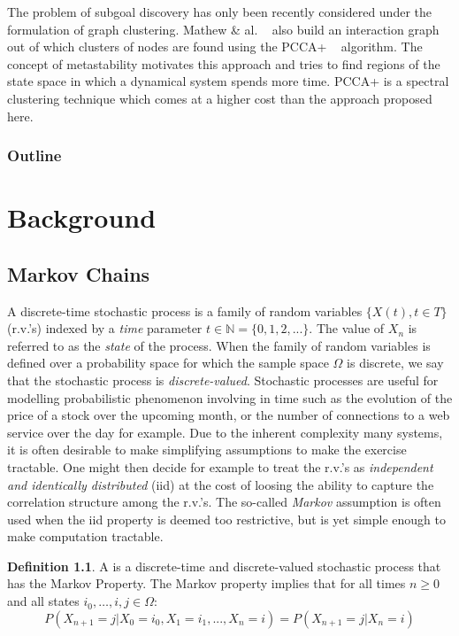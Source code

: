 \documentclass[12pt, oneside, extrafontsizes]{memoir}  %
\newcommand{\rvs}{r.v.'s\xspace}
\newcommand{\termidx}[1]{\index{#1}{\textbf{#1}}}
\theoremstyle{plain}
\theoremstyle{definition}
\newtheorem{defn}{Definition}[section]
\begin{document}
The problem of subgoal discovery has only been recently considered under the
formulation of graph clustering. Mathew \& al. ~\cite{Mathew2012} also build an
interaction graph out of which clusters of nodes are found using the PCCA+
~\cite{Weber2004} algorithm. The concept of metastability motivates this approach
and tries to find regions of the state space in which a dynamical system spends more
time. PCCA+ is a spectral clustering technique which comes at a higher cost than the
approach proposed here.

\subsection{Outline}
\chapter{Background}

\section{Markov Chains}

A discrete-time stochastic process is a family of random variables $\{ X(t), t \in T\}$
(\rvs) indexed by a \textit{time} parameter $t \in \mathbb{N} = \{0, 1, 2,...\}$. The
value of $X_n$ is referred to as the \textit{state} of the process. When the family of
random variables is defined over a probability space for which the sample space
$\Omega$ is discrete, we say that the stochastic process is \textit{discrete-valued}.
Stochastic processes are useful for modelling probabilistic phenomenon involving in
time such as the evolution of the price of a stock over the upcoming month, or the
number of connections to a web service over the day for example. Due to the inherent
complexity many systems, it is often desirable to make simplifying assumptions to
make the exercise tractable. One might then decide for example to treat the \rvs as
\textit{independent and identically distributed} (iid) at the cost of loosing the ability to
capture the correlation structure among the \rvs. The so-called \textit{Markov}
assumption is often used when the iid property is deemed too restrictive, but is yet
simple enough to make computation tractable.

\begin{defn}
A \termidx{Markov Chain} is a discrete-time and discrete-valued stochastic process
that has the Markov Property. The Markov property implies that for all times $n \geq
0$ and all states $i_0, \dots, i, j \in \Omega$:
\begin{equation}
P(X_{n+1} = j | X_0 = i_0, X_1 = i_1, ..., X_n = i) = P( X_{n+1} = j | X_n = i)
\end{equation}
\end{defn}
\end{document}
